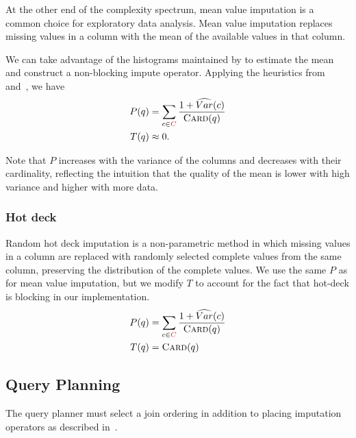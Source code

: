 \subsubsection{}\label{subsubsec:mean}

At the other end of the complexity spectrum, mean value imputation is a common choice for exploratory data analysis.
Mean value imputation replaces missing values in a column with the mean of the available values in that column.

We can take advantage of the histograms maintained by \ProjectName{} to estimate the mean and construct a non-blocking impute operator.
Applying the heuristics from~ and~, we
have
\begin{equation*}
\begin{aligned}
    P(q) &= \sum_{c \in {\color{red}C}} \frac{1+\widehat{Var}(c)}{\textsc{Card}(q)} \\
    T(q) &\approx 0.
\end{aligned}
\end{equation*}

Note that $P$ increases with the variance of the columns and decreases with their cardinality, reflecting the intuition that the quality of the mean is lower with high variance and higher with more data.

\subsubsection{Hot deck}

Random hot deck imputation is a non-parametric method in which missing values in a column are
replaced with randomly selected complete values from the same column, preserving the
distribution of the complete values. We use the same $P$ as for mean value imputation, but
we modify $T$ to account for the fact that hot-deck is blocking in our implementation.  
\begin{equation*}
\begin{aligned}
    P(q) &= \sum_{c \in {\color{red}C}} \frac{1+\widehat{Var}(c)}{\textsc{Card}(q)} \\
    T(q) &= \textsc{Card}(q)
\end{aligned}
\end{equation*}

\subsection{Query Planning}
\label{sec:planning}
The query planner must select a join ordering in addition to placing imputation operators as described in~.


